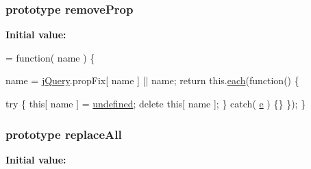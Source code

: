 \hypertarget{jquery-1_810_82-vsdoc_8js_a5f3c3bda90c5d61345bf87ec3eac6145}{
\subsubsection[{remove\-Prop}]{ {\bf prototype} remove\-Prop}}\label{jquery-1_810_82-vsdoc_8js_a5f3c3bda90c5d61345bf87ec3eac6145}
{\bfseries Initial value\-:}
\begin{DoxyCode}
= \textcolor{keyword}{function}( name ) \{


        name = \hyperlink{jquery-1_810_82-vsdoc_8js_add5237586d970a38a81f990e8eb28c6c}{jQuery}.propFix[ name ] || name;
        \textcolor{keywordflow}{return} this.\hyperlink{jquery-1_810_82-vsdoc_8js_aae0bcb6b00035445a8f9b262c96ea8a2}{each}(\textcolor{keyword}{function}() \{
            
            \textcolor{keywordflow}{try} \{
                \textcolor{keyword}{this}[ name ] = \hyperlink{jquery-1_810_82-vsdoc_8js_a08113a236cc18d2a9d5ce27e638012be}{undefined};
                \textcolor{keyword}{delete} \textcolor{keyword}{this}[ name ];
            \} \textcolor{keywordflow}{catch}( \hyperlink{jquery-1_810_82_8min_8js_a2c038346d47955cbe2cb91e338edd7e1}{e} ) \{\}
        \});
    \}
\end{DoxyCode}
\hypertarget{jquery-1_810_82-vsdoc_8js_a2e887b3101a3bb067b3acfd8d292ceb0}{
\subsubsection[{replace\-All}]{ {\bf prototype} replace\-All}}\label{jquery-1_810_82-vsdoc_8js_a2e887b3101a3bb067b3acfd8d292ceb0}
{\bfseries Initial value\-:}

